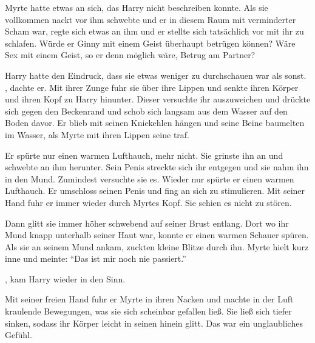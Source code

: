 Myrte hatte etwas an sich, das Harry nicht beschreiben konnte. Als sie vollkommen nackt vor ihm schwebte und er in diesem Raum mit verminderter Scham war, regte sich etwas an ihm und er stellte sich tatsächlich vor mit ihr zu schlafen. Würde er Ginny mit einem Geist überhaupt betrügen können? Wäre Sex mit einem Geist, so er denn möglich wäre, Betrug am Partner?

Harry hatte den Eindruck, dass sie etwas weniger zu durchschauen war als sonst. , dachte er. Mit ihrer Zunge fuhr sie über ihre Lippen und senkte ihren Körper und ihren Kopf zu Harry hinunter. Dieser versuchte ihr auszuweichen und drückte sich gegen den Beckenrand und schob sich langsam aus dem Wasser auf den Boden davor. Er blieb mit seinen Kniekehlen hängen und seine Beine baumelten im Wasser, als Myrte mit ihren Lippen seine traf.

\begin{abAchtzehn}
Er spürte nur einen warmen Lufthauch, mehr nicht. Sie grinste ihn an und schwebte an ihm herunter. Sein Penis streckte sich ihr entgegen und sie nahm ihn in den Mund. Zumindest versuchte sie es. Wieder nur spürte er einen warmen Lufthauch. Er umschloss seinen Penis und fing an sich zu stimulieren. Mit seiner Hand fuhr er immer wieder durch Myrtes Kopf. Sie schien es nicht zu stören.

Dann glitt sie immer höher schwebend auf seiner Brust entlang. Dort wo ihr Mund knapp unterhalb seiner Haut war, konnte er einen warmen Schauer spüren. Als sie an seinem Mund ankam, zuckten kleine Blitze durch ihn. Myrte hielt kurz inne und meinte: \enquote{Das ist mir noch nie passiert.}
\end{abAchtzehn}

, kam Harry wieder in den Sinn.

Mit seiner freien Hand fuhr er Myrte in ihren Nacken und machte in der Luft kraulende Bewegungen, was sie sich scheinbar gefallen ließ. Sie ließ sich tiefer sinken, sodass ihr Körper leicht in seinen hinein glitt. Das war ein unglaubliches Gefühl. 

